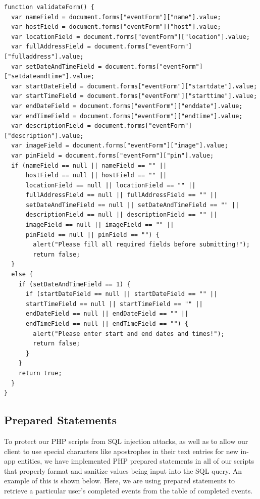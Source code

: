 \documentclass[onecolumn, draftclsnofoot,10pt, compsoc]{IEEEtran}
\begin{document}
    \begin{lstlisting}[style=javascript]
function validateForm() {
  var nameField = document.forms["eventForm"]["name"].value;
  var hostField = document.forms["eventForm"]["host"].value;
  var locationField = document.forms["eventForm"]["location"].value;
  var fullAddressField = document.forms["eventForm"]["fulladdress"].value;
  var setDateAndTimeField = document.forms["eventForm"]["setdateandtime"].value;
  var startDateField = document.forms["eventForm"]["startdate"].value;
  var startTimeField = document.forms["eventForm"]["starttime"].value;
  var endDateField = document.forms["eventForm"]["enddate"].value;
  var endTimeField = document.forms["eventForm"]["endtime"].value;
  var descriptionField = document.forms["eventForm"]["description"].value;
  var imageField = document.forms["eventForm"]["image"].value;
  var pinField = document.forms["eventForm"]["pin"].value;
  if (nameField == null || nameField == "" ||
      hostField == null || hostField == "" ||
      locationField == null || locationField == "" ||
      fullAddressField == null || fullAddressField == "" ||
      setDateAndTimeField == null || setDateAndTimeField == "" ||
      descriptionField == null || descriptionField == "" ||
      imageField == null || imageField == "" ||
      pinField == null || pinField == "") {
        alert("Please fill all required fields before submitting!");
        return false;
  }
  else {
    if (setDateAndTimeField == 1) {
      if (startDateField == null || startDateField == "" ||
      startTimeField == null || startTimeField == "" ||
      endDateField == null || endDateField == "" ||
      endTimeField == null || endTimeField == "") {
        alert("Please enter start and end dates and times!");
        return false;
      }
    }
    return true;
  }
}
    \end{lstlisting}

  \subsection{Prepared Statements}
    To protect our PHP scripts from SQL injection attacks, as well as to allow our client to use special characters like apostrophes in their text entries for new in-app entities, we have implemented PHP prepared statements in all of our scripts that properly format and sanitize values being input into the SQL query. An example of this is shown below. Here, we are using prepared statements to retrieve a particular user's completed events from the table of completed events.
\end{document}
